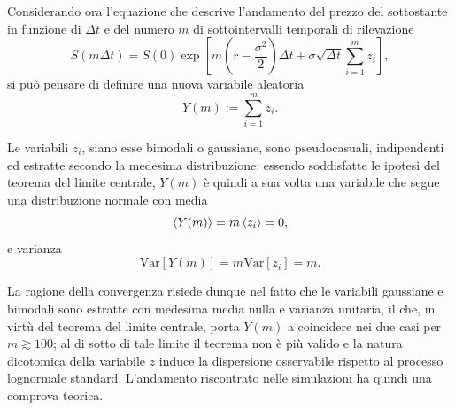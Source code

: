 Considerando ora l'equazione che descrive l'andamento del prezzo del sottostante in funzione di $\Delta t$ e del numero $m$ di sottointervalli temporali di rilevazione
\begin{equation}
    S(m \Delta t) = S(0) \exp{\left[m \left(r - \frac{\sigma^2}{2}\right) \Delta t + \sigma \sqrt{\Delta t} \displaystyle\sum_{i=1}^m z_i\right]},
    \label{eq:price(n)}
\end{equation}
si può pensare di definire una nuova variabile aleatoria
\begin{equation}
   Y(m) := \displaystyle\sum_{i=1}^m z_i.
\end{equation}

Le variabili ${z_i}$, siano esse bimodali o gaussiane, sono  pseudocasuali, indipendenti ed estratte secondo la medesima distribuzione: essendo soddisfatte le ipotesi del teorema del limite centrale, $Y(m)$ è quindi a sua volta una variabile che segue una distribuzione normale con media
\begin{equation}
    \braket{Y(m)} = m\braket{z_i} = 0,
\end{equation}
e varianza
\begin{equation}
    \text{Var}[Y(m)] = m\text{Var}[z_i] = m.
\end{equation}

La ragione della convergenza risiede dunque nel fatto che le variabili gaussiane e bimodali sono estratte con medesima media nulla e varianza unitaria, il che, in virtù del teorema del limite centrale, porta $Y(m)$ a coincidere nei due casi per $m\gtrsim 100$; al di sotto di tale limite il teorema non è più valido e la natura dicotomica della variabile $z$ induce la dispersione osservabile rispetto al processo lognormale standard. L'andamento riscontrato nelle simulazioni ha quindi una comprova teorica.
